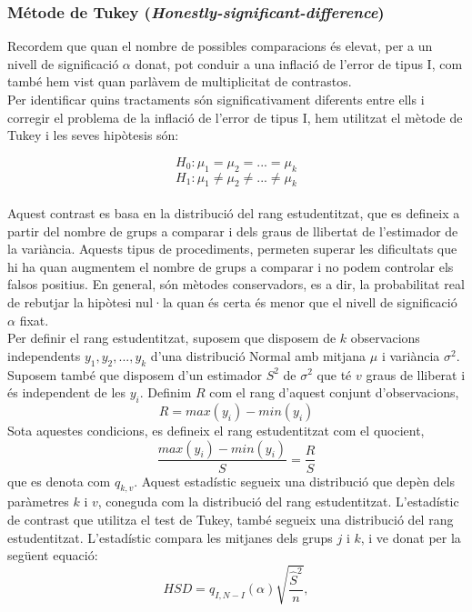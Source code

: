 \documentclass[english]{article}
\begin{document}
\subsubsection{Métode de Tukey (\textit{Honestly-significant-difference})}
Recordem que quan el nombre de possibles comparacions és elevat, per a un nivell de significació $\alpha$ donat, pot conduir a una inflació de l'error de tipus I, com també hem vist quan parlàvem de multiplicitat de contrastos.
\\
Per identificar quins tractaments són significativament diferents entre ells i corregir el problema de la inflació de l'error de tipus I, hem utilitzat el mètode de Tukey i les seves hipòtesis són:

\begin{equation*}
H_{0}: \mu_1 = \mu_2 = ... = \mu_k
\end{equation*}
\vspace{-0.5cm}
\begin{equation*}
H_{1}: \mu_1 \neq \mu_2 \neq ... \neq \mu_k
\end{equation*}
\\
Aquest contrast es basa en la distribució del rang estudentitzat, que es defineix a partir del nombre de grups a comparar i dels graus de llibertat de l'estimador de la variància. Aquests tipus de procediments, permeten superar les dificultats que hi ha quan augmentem el nombre de grups a comparar i no podem controlar els falsos positius. En general, són mètodes conservadors, es a dir, la probabilitat real de rebutjar la hipòtesi nul·la quan és certa és menor que el nivell de significació $\alpha$ fixat.
\\

Per definir el rang estudentitzat, suposem que disposem de $k$ observacions independents $y_1,y_2,...,y_k$ d'una distribució Normal amb mitjana $\mu$ i variància $\sigma^2$. Suposem també que disposem d'un estimador $S^2$ de $\sigma^2$ que té $v$ graus de lliberat i és independent de les $y_i$. Definim $R$ com el rang d'aquest conjunt d'observacions,
\begin{equation*}
R = max(y_i) - min(y_i)
\end{equation*}
Sota aquestes condicions, es defineix el rang estudentitzat com el quocient,
\begin{equation*}
\frac{max(y_i) - min(y_i)}{S} = \frac{R}{S}
\end{equation*}
que es denota com $q_{k,v}$. Aquest estadístic segueix una distribució que depèn dels paràmetres $k$ i $v$, coneguda com la distribució del rang estudentitzat. L'estadístic de contrast que utilitza el test de Tukey, també segueix una distribució del rang estudentitzat. L'estadístic compara les mitjanes dels grups $j$ i $k$, i ve donat per la següent equació:
\begin{equation*}
HSD = q_{I,N-I}(\alpha)\sqrt{\frac{\hat{S}^2}{n}} ,
\end{equation*}
\end{document}
